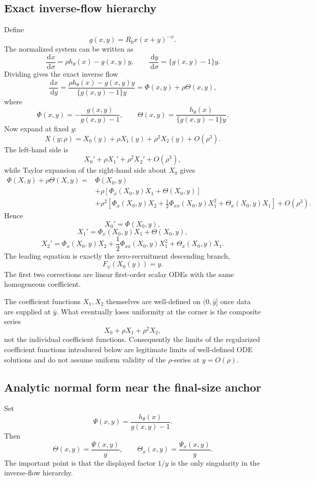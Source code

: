 \documentclass[11pt]{article}
\newcommand{\Rzero}{R_0}
\newcommand{\hth}{h_\theta}
\newcommand{\Fpsi}{F_\psi}
\newcommand{\dd}{\,\mathrm{d}}
\begin{document}
\subsection{Exact inverse-flow hierarchy}
Define
\[
g(x,y)=\Rzero x(x+y)^{-\psi}.
\]
The normalized system can be written as
\[
\frac{\dd x}{\dd\sigma}=\rho\hth(x)-g(x,y)y,
\qquad
\frac{\dd y}{\dd\sigma}=\{g(x,y)-1\}y.
\]
Dividing gives the exact inverse flow
\[
\frac{\dd x}{\dd y}
=
\frac{\rho\hth(x)-g(x,y)y}{\{g(x,y)-1\}y}
=\Phi(x,y)+\rho\Theta(x,y),
\]
where
\[
\Phi(x,y)=-\frac{g(x,y)}{g(x,y)-1},
\qquad
\Theta(x,y)=\frac{\hth(x)}{\{g(x,y)-1\}y}.
\]
Now expand at fixed \(y\):
\[
X(y;\rho)=X_0(y)+\rho X_1(y)+\rho^2X_2(y)+O(\rho^3).
\]
The left-hand side is
\[
X_0'+\rho X_1'+\rho^2X_2'+O(\rho^3),
\]
while Taylor expansion of the right-hand side about \(X_0\) gives
\[
\begin{aligned}
\Phi(X,y)+\rho\Theta(X,y)
={}&\Phi(X_0,y)\\
&+\rho\left[\Phi_x(X_0,y)X_1+\Theta(X_0,y)\right]\\
&+\rho^2\left[
\Phi_x(X_0,y)X_2
+\frac12\Phi_{xx}(X_0,y)X_1^2
+\Theta_x(X_0,y)X_1
\right]
+O(\rho^3).
\end{aligned}
\]
Hence
\[
\boxed{X_0'=\Phi(X_0,y)},
\]
\[
\boxed{X_1'=\Phi_x(X_0,y)X_1+\Theta(X_0,y)},
\]
\[
\boxed{X_2'=\Phi_x(X_0,y)X_2
+\frac12\Phi_{xx}(X_0,y)X_1^2
+\Theta_x(X_0,y)X_1}.
\]
The leading equation is exactly the zero-recruitment descending branch,
\[
\Fpsi(X_0(y))=y.
\]
The first two corrections are linear first-order scalar ODEs with the same homogeneous coefficient.

The coefficient functions \(X_1,X_2\) themselves are well-defined on \((0,\bar y]\) once data are supplied at \(\bar y\).  What eventually loses uniformity at the corner is the composite series
\[
X_0+\rho X_1+\rho^2X_2,
\]
not the individual coefficient functions.  Consequently the limits of the regularized coefficient functions introduced below are legitimate limits of well-defined ODE solutions and do not assume uniform validity of the \(\rho\)-series at \(y=O(\rho)\).

\subsection{Analytic normal form near the final-size anchor}
Set
\[
\Psi(x,y)=\frac{\hth(x)}{g(x,y)-1}.
\]
Then
\[
\Theta(x,y)=\frac{\Psi(x,y)}{y},
\qquad
\Theta_x(x,y)=\frac{\Psi_x(x,y)}{y}.
\]
The important point is that the displayed factor \(1/y\) is the only singularity in the inverse-flow hierarchy.
\end{document}
